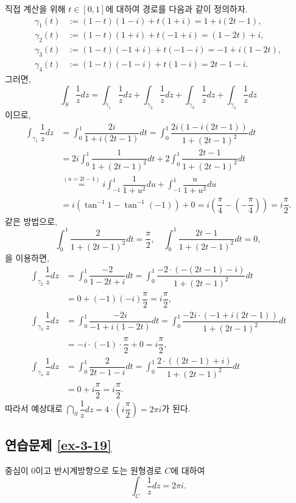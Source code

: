 직접 계산을 위해 $t\in[0,1]$에 대하여 경로를 다음과 같이 정의하자.
\begin{align*}
\gamma_1(t) &:= (1-t)(1-i) + t(1+i) = 1 + i(2t-1), \\
\gamma_2(t) &:= (1-t)(1+i) + t(-1+i) = (1-2t) + i, \\
\gamma_3(t) &:= (1-t)(-1+i) + t(-1-i) = -1 + i(1-2t), \\
\gamma_4(t) &:= (1-t)(-1-i) + t(1-i) = 2t-1 -i.
\end{align*}
그러면,
\[
\int_S \dfrac1z dz = \int_{\gamma_1} \dfrac1z dz
+ \int_{\gamma_2} \dfrac1z dz + \int_{\gamma_3} \dfrac1z dz + \int_{\gamma_4} \dfrac1z dz
\]
이므로,
\begin{align*}
\int_{\gamma_1} \dfrac1z dz
&= \int_0^1 \dfrac{2i}{1+i(2t-1)}dt = \int_0^1 \dfrac{2i(1-i(2t-1))}{1+(2t-1)^2}dt \\
&= 2i\int_0^1\dfrac1{1+(2t-1)^2}dt + 2\int_0^1 \dfrac{2t-1}{1+(2t-1)^2}dt \\
&\stackrel{(u=2t-1)}{=} i \int_{-1}^1 \dfrac1{1+u^2}du  + \int_{-1}^1 \dfrac u{1+u^2}du \\
&= i(\tan^{-1}1 - \tan^{-1}(-1)) + 0 
= i\left(\dfrac\pi4 - \left(-\dfrac\pi4\right)\right) = i \dfrac\pi2.
\end{align*}
같은 방법으로, 
\[
\int_0^1 \dfrac2{1+(2t-1)^2}dt = \dfrac\pi2, \quad
\int_0^1 \dfrac{2t-1}{1+(2t-1)^2}dt = 0,
\]
을 이용하면,
\begin{align*}
\int_{\gamma_2} \dfrac1z dz
&= \int_0^1 \dfrac{-2}{1-2t+i}dt = \int_0^1 \dfrac{-2\cdot(-(2t-1)-i)}{1+(2t-1)^2}dt \\
&= 0 + (-1)(-i)\dfrac\pi2 = i\dfrac\pi2, \\
\int_{\gamma_3} \dfrac1z dz
&= \int_0^1 \dfrac{-2i}{-1+i(1-2t)}dt = \int_0^1 \dfrac{-2i\cdot(-1+i(2t-1))}{1+(2t-1)^2}dt \\
&= -i\cdot(-1)\cdot\dfrac\pi2 +0 = i\dfrac\pi2, \\
\int_{\gamma_4} \dfrac1z dz
&= \int_0^1 \dfrac{2}{2t-1-i}dt = \int_0^1 \dfrac{2\cdot((2t-1)+i)}{1+(2t-1)^2}dt \\
&= 0 + i\dfrac\pi2 = i\dfrac\pi2.
\end{align*}
따라서 예상대로 $\dint_S \dfrac1z dz = 4\cdot\left(i\dfrac\pi2\right) = 2\pi i$가 된다.

\subsection*{연습문제 \ref{ex-3-19}}

중심이 $0$이고 반시계방향으로 도는 원형경로 $C$에 대하여
\[
\int_C \dfrac 1z dz = 2\pi i.
\]


